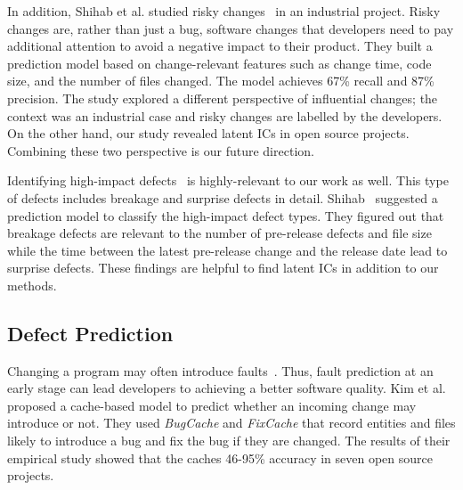 
In addition, Shihab et al. studied risky changes~\cite{shihab_industrial_2012} in an industrial project. Risky changes are, rather than just a bug, software changes that developers need to pay additional attention to avoid a negative impact to their product. They built a prediction model based on change-relevant features such as change time, code size, and the number of files changed. The model achieves 67\% recall and 87\% precision. The study explored a different perspective of influential changes; the context was an industrial case and risky changes are labelled by the developers. On the other hand, our study revealed latent ICs in open source projects. Combining these two perspective is our future direction.

Identifying high-impact defects~\cite{shihab_high-impact_2011} is highly-relevant to our work as well. This type of defects includes breakage and surprise defects in detail. Shihab~\cite{shihab_high-impact_2011} suggested a prediction model to classify the high-impact defect types. They figured out that breakage defects are relevant to the number of pre-release defects and file size while the time between the latest pre-release change and the release date lead to surprise defects. These findings are helpful to find latent ICs in addition to our methods.



\subsection{Defect Prediction}

Changing a program may often introduce
faults~\cite{sliwerski_hatari:_2005,kim_automatic_2006}.
Thus, fault prediction at an early stage can lead developers to achieving
a better software quality. Kim et al.~\cite{kim_predicting_2007} proposed a
cache-based model to predict whether an incoming change may introduce or not.
They used \emph{BugCache} and \emph{FixCache} that record entities and files
likely to introduce a bug and fix the bug if they are changed. The results of
their empirical study showed that the caches 46-95\% accuracy in seven open
source projects.

